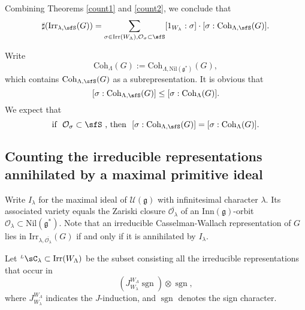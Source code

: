 \documentclass[12pt,a4paper]{amsart}
\newcommand{\CO}{{\mathcal {O}}}
\newcommand{\sgn}{\operatorname{sgn}}
\newcommand{\g}{\mathfrak g}
\numberwithin{equation}{section}
\theoremstyle{remark}
\def\Irr{\mathrm{Irr}}
\def\LC{{}^{\scriptscriptstyle L}\sC}
\def\Coh{\mathrm{Coh}}
\begin{document}
Combining Theorems \ref{count1} and \ref{count2}, we conclude that
  \begin{equation}\label{leq2}
  \sharp(\Irr_{\lambda,\sfS}(G)) = \sum_{\sigma\in \Irr(W_\Lambda), \CO_\sigma\subset \sfS} [1_{W_{\lambda}}: \sigma]\cdot [\sigma: \Coh_{\Lambda,\sfS}(G)].
    \end{equation}

Write
\[
  \Coh_{\Lambda}(G):= \Coh_{\Lambda,\mathrm{Nil}(\g^*)}(G),
  \]
  which contains $ \Coh_{\Lambda,\sfS}(G)$ as a subrepresentation. It is obvious that
  \begin{equation}\label{leq1}
    [\sigma: \Coh_{\Lambda,\sfS}(G)]\leq [\sigma: \Coh_{\Lambda}(G)].
  \end{equation}
  We expect that 
   \begin{equation}\label{leq1}
  \textrm{if $\ \CO_\sigma\subset \sfS\ $, then  }\  [\sigma: \Coh_{\Lambda,\sfS}(G)]= [\sigma: \Coh_{\Lambda}(G)].
  \end{equation}
  
  





\subsection{Counting the irreducible representations annihilated by a maximal primitive ideal}
Write $I_\lambda$ for the maximal ideal of $\mathcal U(\g)$ with infinitesimal character $\lambda$. Its associated variety equals the Zariski closure $\overline{\CO_\lambda}$ of an $\mathrm{Inn}(\g)$-orbit  $\CO_\lambda\subset\mathrm{Nil}(\g^*) $.  Note that an irreducible Casselman-Wallach representation of $G$ lies in $\Irr_{\lambda,\overline{\CO_\lambda}}(G)$ if and only if it is annihilated by $I_\lambda$. 


Let $\LC_{\lambda}\subset \Irr(W_\Lambda)$ be the subset consisting all the irreducible representations that occur in 
  \[
    (J_{W_{\lambda}}^{W_{\Lambda}} \sgn )\otimes \sgn,
  \]
where $J_{W_{\lambda}}^{W_{\Lambda}} $ indicates the $J$-induction, and $\sgn$ denotes the sign character. 
\end{document}
